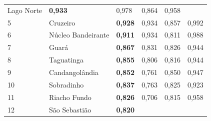\begin{table}[c]
\begin{tabular}{llllll}
        {\color[HTML]{0B0080} Lago Norte} &
        {\color[HTML]{202122} \textbf{0,933}} &
        {\color[HTML]{202122} 0,978} &
        {\color[HTML]{202122} 0,864} &
        {\color[HTML]{202122} 0,958} \\
        \rowcolor[HTML]{F8F9FA}
        {\color[HTML]{202122} 5} &
        {\color[HTML]{0B0080} Cruzeiro} &
        {\color[HTML]{202122} \textbf{0,928}} &
        {\color[HTML]{202122} 0,934} &
        {\color[HTML]{202122} 0,857} &
        {\color[HTML]{202122} 0,992} \\
        \rowcolor[HTML]{F8F9FA}
        {\color[HTML]{202122} 6} &
        {\color[HTML]{0B0080} Núcleo Bandeirante} &
        {\color[HTML]{202122} \textbf{0,911}} &
        {\color[HTML]{202122} 0,934} &
        {\color[HTML]{202122} 0,811} &
        {\color[HTML]{202122} 0,988} \\
        \rowcolor[HTML]{F8F9FA}
        {\color[HTML]{202122} 7} &
        {\color[HTML]{0B0080} Guará} &
        {\color[HTML]{202122} \textbf{0,867}} &
        {\color[HTML]{202122} 0,831} &
        {\color[HTML]{202122} 0,826} &
        {\color[HTML]{202122} 0,944} \\
        \rowcolor[HTML]{F8F9FA}
        {\color[HTML]{202122} 8} &
        {\color[HTML]{0B0080} Taguatinga} &
        {\color[HTML]{202122} \textbf{0,855}} &
        {\color[HTML]{202122} 0,806} &
        {\color[HTML]{202122} 0,816} &
        {\color[HTML]{202122} 0,944} \\
        \rowcolor[HTML]{F8F9FA}
        {\color[HTML]{202122} 9} &
        {\color[HTML]{0B0080} Candangolândia} &
        {\color[HTML]{202122} \textbf{0,852}} &
        {\color[HTML]{202122} 0,761} &
        {\color[HTML]{202122} 0,850} &
        {\color[HTML]{202122} 0,947} \\
        \rowcolor[HTML]{F8F9FA}
        {\color[HTML]{202122} 10} &
        {\color[HTML]{0B0080} Sobradinho} &
        {\color[HTML]{202122} \textbf{0,837}} &
        {\color[HTML]{202122} 0,763} &
        {\color[HTML]{202122} 0,825} &
        {\color[HTML]{202122} 0,923} \\
        \rowcolor[HTML]{F8F9FA}
        {\color[HTML]{202122} 11} &
        {\color[HTML]{0B0080} Riacho Fundo} &
        {\color[HTML]{202122} \textbf{0,826}} &
        {\color[HTML]{202122} 0,706} &
        {\color[HTML]{202122} 0,815} &
        {\color[HTML]{202122} 0,958} \\
        \rowcolor[HTML]{F8F9FA}
        {\color[HTML]{202122} 12} &
        {\color[HTML]{0B0080} São Sebastião} &
        {\color[HTML]{202122} \textbf{0,820}} &

\end{tabular}
\end{table}
